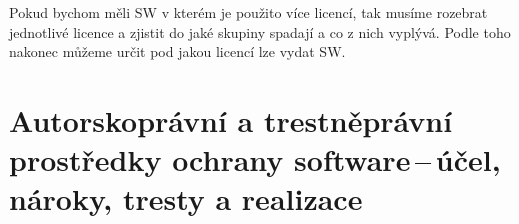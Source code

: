 Pokud bychom měli SW v kterém je použito více licencí, tak musíme rozebrat jednotlivé licence a zjistit do jaké skupiny spadají a co z nich vyplývá. Podle toho nakonec můžeme určit pod jakou licencí lze vydat SW.








\newpage
\section{Autorskoprávní a trestněprávní prostředky ochrany software\,--\,účel, nároky, tresty a realizace}

\newpage